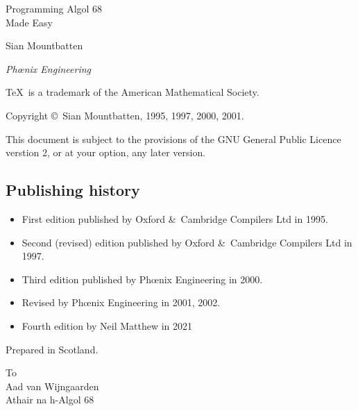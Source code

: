 %
%
\thispagestyle{empty}
\vglue 20mm
\begin{center}
\Huge Programming Algol 68\\ Made Easy
\end{center}
\vskip 10mm
\begin{center}
\Large Sian Mountbatten
\end{center}
\vfill
\begin{center}
\emph{Ph\oe{}nix Engineering}
\end{center}
\newpage
\thispagestyle{empty}
\parindent=0mm
\vfill
\small
\TeX\ is a trademark of the American Mathematical Society.\par
\smallskip
Copyright \copyright\ Sian Mountbatten, 1995, 1997, 2000, 2001.\par
\medskip
This document is subject to the provisions of the GNU General Public
Licence verstion 2, or at your option, any later version.\par
\bigskip
\subsection*{Publishing history}
\begin{itemize}
\item First edition published by Oxford \&\ Cambridge Compilers Ltd
in 1995.
\item Second (revised) edition published by Oxford \&\ Cambridge
Compilers Ltd in 1997.
\item Third edition published by Ph\oe{}nix Engineering in 2000.
\item Revised by Ph\oe{}nix Engineering in 2001, 2002.
\item Fourth edition by Neil Matthew in 2021
\end{itemize}
\vfill
Prepared in Scotland.
\newpage
\thispagestyle{empty}
\vglue 40mm
\begin{flushright}
\textsf To\\
\medskip
\Large Aad van Wijngaarden\\
\bigskip\medskip
\normalsize Athair na h-Algol 68
\end{flushright}
\newpage
